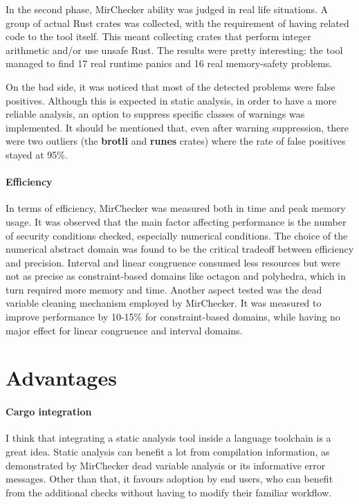 \documentclass{article}
\begin{document}
In the second phase, 
MirChecker ability was judged in real life situations. A group of actual Rust crates was collected, with the requirement of having related code to 
the tool itself. This meant collecting crates that perform integer arithmetic and/or use unsafe Rust. The results were pretty interesting: the tool managed to find
17 real runtime panics and 16 real memory-safety problems. 

On the bad side, it was noticed that most of the detected problems 
were false positives. Although this is expected in static analysis, in order to have
a more reliable analysis, an option to suppress specific classes of warnings was implemented. It should be mentioned that, even after warning suppression, there were two outliers (the \textbf{brotli} and \textbf{runes} crates) where the rate 
of false positives stayed at 95\%.

\paragraph{Efficiency} In terms of efficiency, MirChecker was measured both in time and peak memory usage. It was observed that 
the main factor affecting performance is the number of security conditions checked, especially numerical conditions. The choice of the numerical abstract domain 
was found to be the critical tradeoff between efficiency and precision. Interval and linear congruence  consumed less resources but were not as precise as constraint-based domains 
like octagon and polyhedra, which in turn required more memory and time. Another aspect tested was  the dead variable cleaning mechanism 
employed by MirChecker. It was measured to improve performance by 
 10-15\% for constraint-based domains,  while having no major effect for linear congruence and interval domains. 
 
 \section{Advantages}

 \paragraph{Cargo integration} I think that integrating a static analysis tool inside a language toolchain is a great idea. 
 Static analysis can benefit a lot from compilation information, as demonstrated by MirChecker dead variable analysis or its 
 informative error messages. Other than that, it favours adoption by end users, who can benefit from the additional checks without 
 having to modify their familiar workflow.
\end{document}
